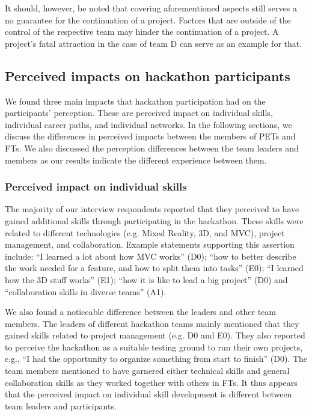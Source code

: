 \documentclass{hcij}
\begin{document}
It should, however, be noted that covering aforementioned aspects still serves a no guarantee for the continuation of a project. Factors that are outside of the control of the respective team may hinder the continuation of a project. A project’s fatal attraction in the case of team D can serve as an example for that.

\subsection{Perceived impacts on hackathon participants}
We found three main impacts that hackathon participation had on the participants’ perception. These are perceived impact on individual skills, individual career paths, and individual networks. In the following sections, we discuss the differences in perceived impacts between the members of PETs and FTs. We also discussed the perception differences between the team leaders and members as our results indicate the different experience between them.

\subsubsection{Perceived impact on individual skills}
The majority of our interview respondents reported that they perceived to have gained additional skills through participating in the hackathon. These skills were related to different technologies (e.g. Mixed Reality, 3D, and MVC), project management, and collaboration. Example statements supporting this assertion include: “I learned a lot about how MVC works” (D0); “how to better describe the work needed for a feature, and how to split them into tasks” (E0); “I learned how the 3D stuff works” (E1); “how it is like to lead a big project” (D0) and “collaboration skills in diverse teams” (A1).

We also found a noticeable difference between the leaders and other team members. The leaders of different hackathon teams mainly mentioned that they gained skills related to project management (e.g. D0 and E0). They also reported to perceive the hackathon as a suitable testing ground to run their own projects, e.g., “I had the opportunity to organize something from start to finish” (D0). The team members mentioned to have garnered either technical skills and general collaboration skills as they worked together with others in FTs. It thus appears that the perceived impact on individual skill development is different between team leaders and participants.
\end{document}
